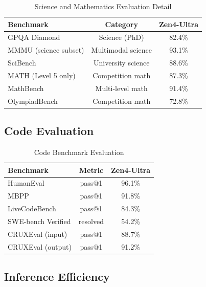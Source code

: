 \documentclass[11pt,a4paper]{article}
\begin{document}
\begin{table}[H]
\centering
\begin{tabular}{lcc}
\toprule
\textbf{Benchmark} & \textbf{Category} & \textbf{Zen4-Ultra} \\
\midrule
GPQA Diamond            & Science (PhD)      & 82.4\% \\
MMMU (science subset)   & Multimodal science & 93.1\% \\
SciBench                & University science & 88.6\% \\
MATH (Level 5 only)     & Competition math   & 87.3\% \\
MathBench               & Multi-level math   & 91.4\% \\
OlympiadBench           & Competition math   & 72.8\% \\
\bottomrule
\end{tabular}
\caption{Science and Mathematics Evaluation Detail}
\end{table}

\subsection{Code Evaluation}

\begin{table}[H]
\centering
\begin{tabular}{lcc}
\toprule
\textbf{Benchmark} & \textbf{Metric} & \textbf{Zen4-Ultra} \\
\midrule
HumanEval           & pass@1           & 96.1\% \\
MBPP                & pass@1           & 91.8\% \\
LiveCodeBench       & pass@1           & 84.3\% \\
SWE-bench Verified  & resolved         & 54.2\% \\
CRUXEval (input)    & pass@1           & 88.7\% \\
CRUXEval (output)   & pass@1           & 91.2\% \\
\bottomrule
\end{tabular}
\caption{Code Benchmark Evaluation}
\end{table}

\subsection{Inference Efficiency}
\end{document}

